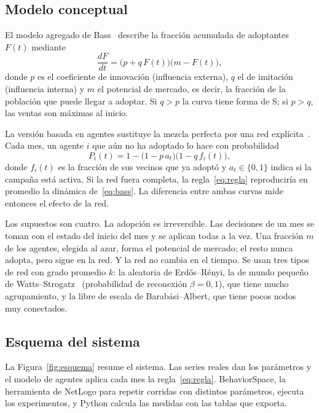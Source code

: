 \documentclass{llncs}
\begin{document}
\subsection{Modelo conceptual}

El modelo agregado de Bass~\cite{bass1969} describe la fracción acumulada de adoptantes $F(t)$ mediante
\begin{equation}
  \frac{dF}{dt} = \bigl(p + q\,F(t)\bigr)\bigl(m - F(t)\bigr),
  \label{eq:bass}
\end{equation}
donde $p$ es el coeficiente de innovación (influencia externa), $q$ el de imitación (influencia interna) y $m$ el potencial de mercado, es decir, la fracción de la población que puede llegar a adoptar. Si $q>p$ la curva tiene forma de S; si $p>q$, las ventas son máximas al inicio.

La versión basada en agentes sustituye la mezcla perfecta por una red explícita~\cite{goldenberg2001}. Cada mes, un agente $i$ que aún no ha adoptado lo hace con probabilidad
\begin{equation}
  P_i(t) = 1 - \bigl(1 - p\,a_t\bigr)\bigl(1 - q\,f_i(t)\bigr),
  \label{eq:regla}
\end{equation}
donde $f_i(t)$ es la fracción de sus vecinos que ya adoptó y $a_t\in\{0,1\}$ indica si la campaña está activa. Si la red fuera completa, la regla~\eqref{eq:regla} reproduciría en promedio la dinámica de~\eqref{eq:bass}. La diferencia entre ambas curvas mide entonces el efecto de la red.

Los supuestos son cuatro. La adopción es irreversible. Las decisiones de un mes se toman con el estado del inicio del mes y se aplican todas a la vez. Una fracción $m$ de los agentes, elegida al azar, forma el potencial de mercado; el resto nunca adopta, pero sigue en la red. Y la red no cambia en el tiempo. Se usan tres tipos de red con grado promedio $k$: la aleatoria de Erdős--Rényi, la de mundo pequeño de Watts--Strogatz~\cite{watts1998} (probabilidad de reconexión $\beta=0{,}1$), que tiene mucho agrupamiento, y la libre de escala de Barabási--Albert, que tiene pocos nodos muy conectados.

\subsection{Esquema del sistema}

La Figura~\ref{fig:esquema} resume el sistema. Las series reales dan los parámetros y el modelo de agentes aplica cada mes la regla~\eqref{eq:regla}. BehaviorSpace, la herramienta de NetLogo para repetir corridas con distintos parámetros, ejecuta los experimentos, y Python calcula las medidas con las tablas que exporta.
\end{document}
